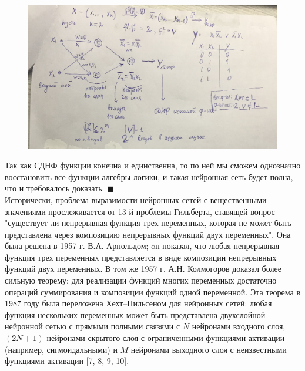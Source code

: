 \documentclass[a4paper, 14pt]{extarticle}
\begin{document}
    \begin{figure}[h]
    \begin{center}
    \includegraphics[width=1\linewidth]{picture1.png}
    \caption{}
    \label{ris:experimcoded}
    \end{center}
    \end{figure}
    
    Так как СДНФ функции конечна и единственна, то по ней мы сможем однозначно восстановить все функции алгебры логики, и такая нейронная сеть будет полна, что и требовалось доказать. \hfill $\blacksquare$\\
    
    Исторически, проблема выразимости нейронных сетей с вещественными значениями прослеживается от 13-й проблемы Гильберта, ставящей вопрос "существует ли непрерывная функция трех переменных, которая не может быть представлена через композицию непрерывных функций двух переменных". Она была решена в 1957 г. В.А. Арнольдом; oн показал, что любая непрерывная функция трех переменных представляется в виде композиции непрерывных функций двух переменных. В том же 1957 г. А.Н. Колмогоров доказал более сильную теорему: для реализации функций многих переменных достаточно операций суммирования и композиции функций одной переменной. Эта теорема в 1987 году была переложена Хехт–Нильсеном для нейронных сетей: любая функция нескольких переменных может быть представлена двухслойной нейронной сетью с прямыми полными связями с $N$ нейронами входного слоя, $(2N+1)$ нейронами скрытого слоя с ограниченными  функциями активации (например, сигмоидальными) и $M$ нейронами выходного слоя с неизвестными функциями активации \hyperlink{p7}{[7, 8, 9, 10]}.
    
\end{document}

